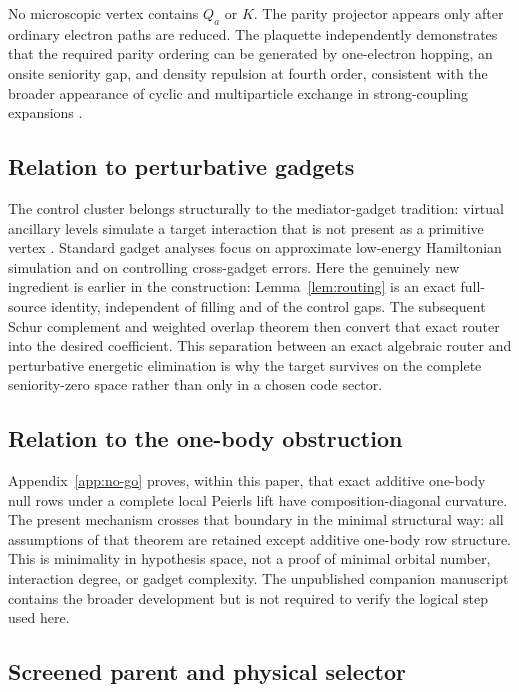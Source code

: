 \documentclass[11pt]{article}
\theoremstyle{definition}
\theoremstyle{remark}
\begin{document}
No microscopic vertex contains $Q_a$ or $K$.  The parity projector appears only after ordinary electron paths are reduced.  The plaquette independently demonstrates that the required parity ordering can be generated by one-electron hopping, an onsite seniority gap, and density repulsion at fourth order, consistent with the broader appearance of cyclic and multiparticle exchange in strong-coupling expansions \cite{MacDonald1988,Aligia2018}.

\subsection{Relation to perturbative gadgets}

The control cluster belongs structurally to the mediator-gadget tradition: virtual ancillary levels simulate a target interaction that is not present as a primitive vertex \cite{Kempe2006,Oliveira2008,Jordan2008}.  Standard gadget analyses focus on approximate low-energy Hamiltonian simulation and on controlling cross-gadget errors.  Here the genuinely new ingredient is earlier in the construction: Lemma~\ref{lem:routing} is an exact full-source identity, independent of filling and of the control gaps.  The subsequent Schur complement and weighted overlap theorem then convert that exact router into the desired coefficient.  This separation between an exact algebraic router and perturbative energetic elimination is why the target survives on the complete seniority-zero space rather than only in a chosen code sector.

\subsection{Relation to the one-body obstruction}

Appendix~\ref{app:no-go} proves, within this paper, that exact additive one-body null rows under a complete local Peierls lift have composition-diagonal curvature.  The present mechanism crosses that boundary in the minimal structural way: all assumptions of that theorem are retained except additive one-body row structure.  This is minimality in hypothesis space, not a proof of minimal orbital number, interaction degree, or gadget complexity.  The unpublished companion manuscript \cite{SledgianowskiNoGo} contains the broader development but is not required to verify the logical step used here.

\subsection{Screened parent and physical selector}
\end{document}

